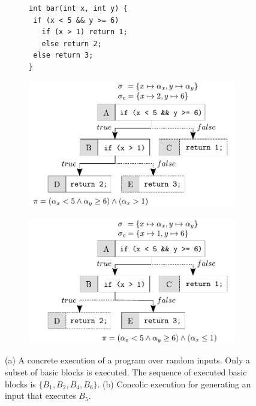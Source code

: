 \begin{figure}[t]
  \hspace{-3mm}
  \begin{subfigure}{.29\textwidth}
    \vspace{5mm}
    \begin{lstlisting}[basicstyle=\ttfamily\scriptsize]
int bar(int x, int y) {
 if (x < 5 && y >= 6) 
   if (x > 1) return 1;
   else return 2;
 else return 3;
}
    \end{lstlisting}
    \vspace{5mm}
    \caption{}
  \end{subfigure}%
  \hspace{-0mm}
  \begin{subfigure}{.37\textwidth}
    \centering
    \includegraphics[width=1.0\columnwidth]{images/concolic-execution} 
    \caption{}
  \end{subfigure}%
  \begin{subfigure}{.33\textwidth}
    \centering
    \vspace{0.05mm}
    \includegraphics[width=1.1\columnwidth]{images/concolic-execution-2} 
    \caption{}
  \end{subfigure}
  \caption{(a) A concrete execution of a program over random inputs. Only a subset of basic blocks is executed. The sequence of executed basic blocks is $\{B_1, B_2, B_4, B_6\}$. (b) Concolic execution for generating an input that executes $B_5$.}
  \label{fig:example-concrete-execution}
  \vspace{-3mm}
\end{figure}

